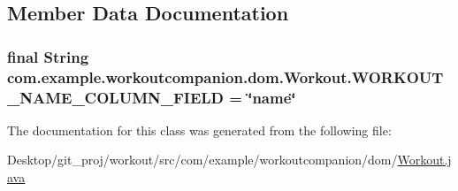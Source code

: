 \subsection{Member Data Documentation}
\hypertarget{classcom_1_1example_1_1workoutcompanion_1_1dom_1_1_workout_a18f5c457f9aa5822f652f8a920f2ac9a}{
\subsubsection[{W\-O\-R\-K\-O\-U\-T\-\_\-\-N\-A\-M\-E\-\_\-\-C\-O\-L\-U\-M\-N\-\_\-\-F\-I\-E\-L\-D}]{\setlength{\rightskip}{0pt plus 5cm}final String com.\-example.\-workoutcompanion.\-dom.\-Workout.\-W\-O\-R\-K\-O\-U\-T\-\_\-\-N\-A\-M\-E\-\_\-\-C\-O\-L\-U\-M\-N\-\_\-\-F\-I\-E\-L\-D = \char`\"{}name\char`\"{}\hspace{0.3cm}{\ttfamily [static]}}}\label{classcom_1_1example_1_1workoutcompanion_1_1dom_1_1_workout_a18f5c457f9aa5822f652f8a920f2ac9a}


The documentation for this class was generated from the following file\-:\begin{DoxyCompactItemize}
\item 
Desktop/git\-\_\-proj/workout/src/com/example/workoutcompanion/dom/\hyperlink{_workout_8java}{Workout.\-java}\end{DoxyCompactItemize}
